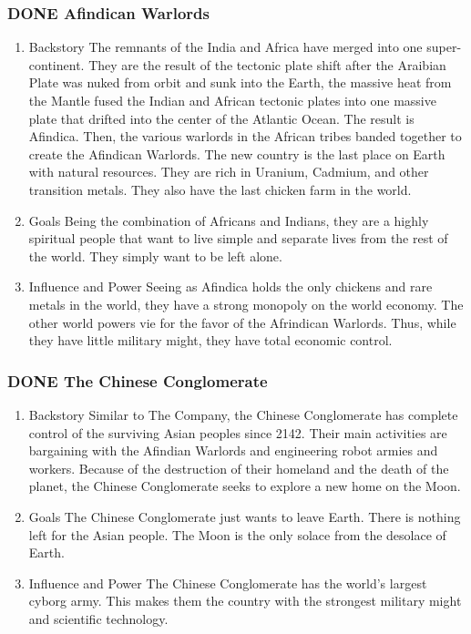 \documentclass[11pt]{article}
\begin{document}
\subsubsection{{\bfseries\sffamily DONE} Afindican Warlords}
\label{sec:orgcf66af5}
\begin{enumerate}
\item Backstory
\label{sec:org69327fe}
The remnants of the India and Africa have merged into one super-continent. They are the result of the tectonic plate shift after the Araibian Plate was nuked from orbit and sunk into the Earth, the massive heat from the Mantle fused the Indian and African tectonic plates into one massive plate that drifted into the center of the Atlantic Ocean. The result is Afindica. Then, the various warlords in the African tribes banded together to create the Afindican Warlords. The new country is the last place on Earth with natural resources. They are rich in Uranium, Cadmium, and other transition metals. They also have the last chicken farm in the world.

\item Goals
\label{sec:org945d661}
Being the combination of Africans and Indians, they are a highly spiritual people that want to live simple and separate lives from the rest of the world. They simply want to be left alone.

\item Influence and Power
\label{sec:org4e66baa}
Seeing as Afindica holds the only chickens and rare metals in the world, they have a strong monopoly on the world economy. The other world powers vie for the favor of the Afrindican Warlords. Thus, while they have little military might, they have total economic control.
\end{enumerate}

\subsubsection{{\bfseries\sffamily DONE} The Chinese Conglomerate}
\label{sec:org7ce8e57}
\begin{enumerate}
\item Backstory
\label{sec:org9808352}
Similar to The Company, the Chinese Conglomerate has complete control of the surviving Asian peoples since 2142. Their main activities are bargaining with the Afindian Warlords and engineering robot armies and workers. Because of the destruction of their homeland and the death of the planet, the Chinese Conglomerate seeks to explore a new home on the Moon.

\item Goals
\label{sec:orgf474617}
The Chinese Conglomerate just wants to leave Earth. There is nothing left for the Asian people. The Moon is the only solace from the desolace of Earth.

\item Influence and Power
\label{sec:org7a15cdc}
The Chinese Conglomerate has the world's largest cyborg army. This makes them the country with the strongest military might and scientific technology.
\end{enumerate}
\end{document}

